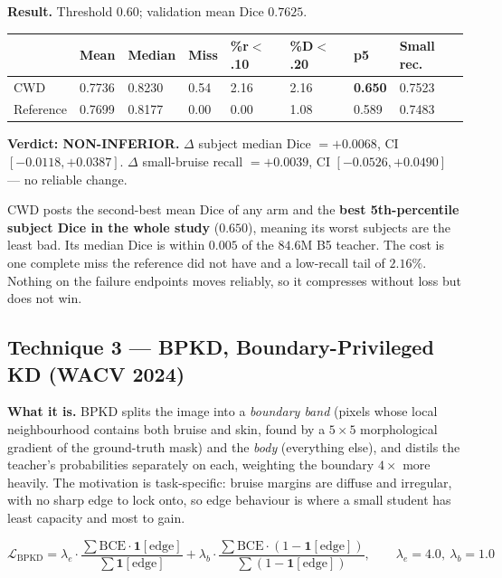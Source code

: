 \documentclass[11pt]{article}
\begin{document}
\vspace{4pt}
\textbf{Result.} Threshold $0.60$; validation mean Dice $0.7625$.

\begin{center}\small
\begin{tabular}{K q q q q q q M}
\toprule
& \textbf{Mean} & \textbf{Median} & \textbf{Miss} & \textbf{\%r$<$.10} & \textbf{\%D$<$.20} &
\textbf{p5} & \textbf{Small rec.} \\
\midrule
CWD       & 0.7736 & 0.8230 & 0.54 & 2.16 & 2.16 & \textbf{0.650} & 0.7523 \\
Reference & 0.7699 & 0.8177 & 0.00 & 0.00 & 1.08 & 0.589 & 0.7483 \\
\bottomrule
\end{tabular}
\end{center}

\textbf{Verdict: NON-INFERIOR.}
$\Delta$ subject median Dice $=+0.0068$, CI $[-0.0118,+0.0387]$.
$\Delta$ small-bruise recall $=+0.0039$, CI $[-0.0526,+0.0490]$ --- no reliable change.

CWD posts the second-best mean Dice of any arm and the \textbf{best 5th-percentile subject Dice in
the whole study} ($0.650$), meaning its worst subjects are the least bad. Its median Dice is within
$0.005$ of the $84.6$M B5 teacher. The cost is one complete miss the reference did not have and a
low-recall tail of $2.16\%$. Nothing on the failure endpoints moves reliably, so it compresses
without loss but does not win.

\subsection{Technique 3 --- BPKD, Boundary-Privileged KD (WACV 2024)}

\textbf{What it is.} BPKD splits the image into a \emph{boundary band} (pixels whose local
neighbourhood contains both bruise and skin, found by a $5\times5$ morphological gradient of the
ground-truth mask) and the \emph{body} (everything else), and distils the teacher's probabilities
separately on each, weighting the boundary $4\times$ more heavily. The motivation is
task-specific: bruise margins are diffuse and irregular, with no sharp edge to lock onto, so edge
behaviour is where a small student has least capacity and most to gain.

\[
  \mathcal{L}_{\mathrm{BPKD}}
  =\lambda_{e}\!\cdot\!\frac{\sum \mathrm{BCE}\cdot\mathbf{1}[\text{edge}]}{\sum\mathbf{1}[\text{edge}]}
  +\lambda_{b}\!\cdot\!\frac{\sum \mathrm{BCE}\cdot(1-\mathbf{1}[\text{edge}])}
       {\sum(1-\mathbf{1}[\text{edge}])},
  \qquad \lambda_e=4.0,\ \lambda_b=1.0
\]
\end{document}
